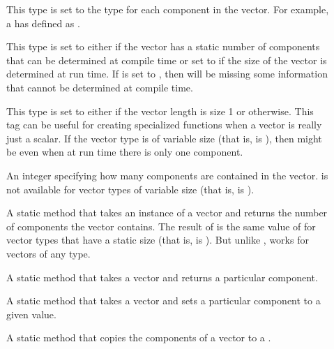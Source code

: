 \begin{description}
\item[]
  This type is set to the type for each component in the vector.
  For example, a  has  defined as .
\item[]
    
  This type is set to either  if the vector has a static number of components that can be determined at compile time or set to  if the size of the vector is determined at run time.
  If  is set to , then  will be missing some information that cannot be determined at compile time.
\item[]
    
  This type is set to either  if the vector length is size 1 or  otherwise.
  This tag can be useful for creating specialized functions when a vector is really just a scalar.
  If the vector type is of variable size (that is,  is ), then  might be  even when at run time there is only one component.
\item[] 
  An integer specifying how many components are contained in the vector.
   is not available for vector types of variable size (that is,  is ).
\item[] 
  A static method that takes an instance of a vector and returns the number of components the vector contains.
  The result of  is the same value of  for vector types that have a static size (that is,  is ).
  But unlike ,  works for vectors of any type.
\item[] 
  A static method that takes a vector and returns a particular component.
\item[] 
  A static method that takes a vector and sets a particular component to a given value.
\item[] 
  A static method that copies the components of a vector to a .
\end{description}

